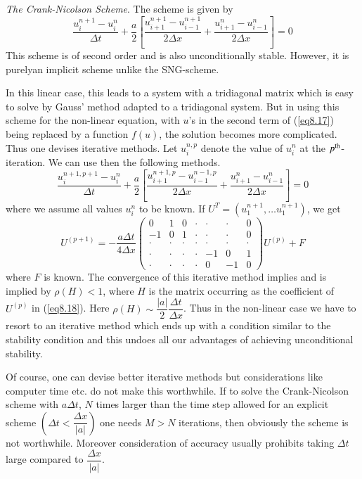 \begin{exam}\label{chap8:exam8.6}
{\em The Crank-Nicolson Scheme}. The scheme is given by 
\begin{equation*}
\frac{u^{n+1}_i - u^n_i}{\Delta t} + \frac{a}{2} \left[\frac{u^{n+1}_{i+1} - u^{n+1}_{i-1}}{2\Delta x} + \frac{u^n_{i+1} - u^n_{i-1}}{2\Delta x} \right] = 0
\tag{8.17}\label{eq8.17}
\end{equation*}
This scheme is of second order and is also unconditionally
stable. However, it is purely\pageoriginale an implicit scheme unlike the
SNG-scheme. 

In this linear case, this leads to a system with a tridiagonal matrix which is easy to solve by Gauss' method adapted to a tridiagonal system. But in using this scheme for the non-linear equation, with $u$'s in the second term of (\ref{eq8.17}) being replaced by a function $f(u)$, the solution becomes more complicated. Thus one devises iterative methods. Let $u^{n,p}_i$ denote the value of $u^n_i$ at the $p^{\rm th}$-iteration. We can use then the following methods.
$$
\frac{u^{n+1, p+1}_i - u^n_i }{\Delta t} + \frac{a}{2} \left[  \frac{u^{n+1, p}_{i+1} - u^{n-1,p}_{i-1}}{2\Delta x} + \frac{u^n_{i+1} - u^n_{i-1}}{2\Delta x}\right] = 0
$$
where we assume all values $u^n_i$ to be known. If $U^T = (u^{n+1}_1 , \ldots u^{n+1}_1)$, we get
\begin{equation*}
U^{(p+1)} = - \frac{a\Delta t}{4\Delta x} 
\begin{pmatrix}
0 & 1 & 0 & \cdot & \cdot & \cdot & 0\\
-1 & 0 & 1 & \cdot & \cdot & \cdot & 0\\
\cdot & \cdot & \cdot & \cdot & \cdot & \cdot & \cdot \\
\cdot & \cdot & \cdot & \cdot & -1 & 0 & 1\\ 
\cdot & \cdot & \cdot & \cdot & 0 & -1 & 0
\end{pmatrix} U^{(p)} + F
\tag{8.18}\label{eq8.18}
\end{equation*}
where $F$ is known. The convergence of this iterative method implies and is implied by $\rho (H) <1$, where $H$ is the matrix occurring as the coefficient of $U^{(p)}$ in (\ref{eq8.18}). Here $\rho (H) \sim \dfrac{|a|}{2} \dfrac{\Delta t}{\Delta x}$.  Thus in the non-linear case we have to resort to an iterative method which ends up with a condition similar to the stability condition and this undoes all our advantages of achieving unconditional stability.

Of course, one can devise better iterative methods but considerations
like computer time etc. do not make this worthwhile. If to solve the
Crank-Nicolson scheme with $a \Delta t$, $N$ times larger than the
time step allowed for an explicit scheme $\left(\Delta t < \dfrac{\Delta
  x}{|a|}\right)$ one needs $M>N$ iterations, then obviously the scheme is
not worthwhile. Moreover consideration of accuracy usually prohibits
taking $\Delta t$ large compared to $\dfrac{\Delta x}{|a|}$. 
\end{exam}

